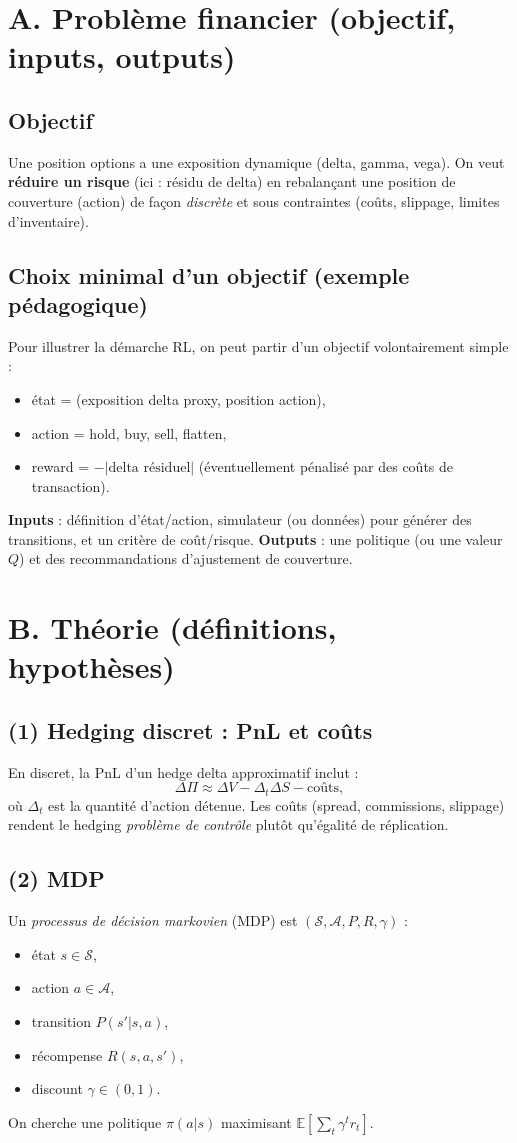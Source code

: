 \documentclass[11pt,a4paper]{report}
\theoremstyle{definition}
\theoremstyle{plain}
\theoremstyle{remark}
\newcommand{\E}{\mathbb{E}}
\newcommand{\1}{\mathbf{1}}
\begin{document}
\section{A. Problème financier (objectif, inputs, outputs)}
\subsection*{Objectif}
Une position options a une exposition dynamique (delta, gamma, vega). On veut \textbf{réduire un risque} (ici : résidu de delta) en rebalançant une position de couverture (action) de façon \emph{discrète} et sous contraintes (coûts, slippage, limites d'inventaire).

\subsection*{Choix minimal d'un objectif (exemple pédagogique)}
Pour illustrer la démarche RL, on peut partir d'un objectif volontairement simple :
\begin{itemize}[leftmargin=*]
\item état = (exposition delta proxy, position action),
\item action = {hold, buy, sell, flatten},
\item reward = $-| \text{delta résiduel} |$ (éventuellement pénalisé par des coûts de transaction).
\end{itemize}

\textbf{Inputs} : définition d'état/action, simulateur (ou données) pour générer des transitions, et un critère de coût/risque.
\textbf{Outputs} : une politique (ou une valeur $Q$) et des recommandations d'ajustement de couverture.

\section{B. Théorie (définitions, hypothèses)}
\subsection*{(1) Hedging discret : PnL et coûts}
En discret, la PnL d'un hedge delta approximatif inclut :
\[
\Delta \Pi \approx \Delta V - \Delta_t \Delta S - \text{coûts},
\]
où $\Delta_t$ est la quantité d'action détenue. Les coûts (spread, commissions, slippage) rendent le hedging \emph{problème de contrôle} plutôt qu'égalité de réplication.

\subsection*{(2) MDP}
Un \emph{processus de décision markovien} (MDP) est $(\mathcal{S},\mathcal{A},P,R,\gamma)$ :
\begin{itemize}[leftmargin=*]
\item état $s\in\mathcal{S}$,
\item action $a\in\mathcal{A}$,
\item transition $P(s'|s,a)$,
\item récompense $R(s,a,s')$,
\item discount $\gamma\in(0,1)$.
\end{itemize}
On cherche une politique $\pi(a|s)$ maximisant $\E[\sum_t \gamma^t r_t]$.
\end{document}
